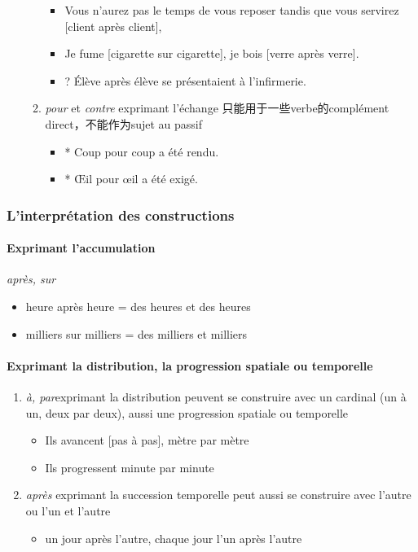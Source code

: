 \documentclass[UTF8]{report}
\begin{document}
\begin{enumerate}
\begin{enumerate}
        \begin{itemize}
            \item Vous n’aurez pas le temps de vous reposer tandis que vous servirez [client après client],
            \item Je fume [cigarette sur cigarette], je bois [verre après verre].
            \item ? Élève après élève se présentaient à l’infirmerie.
        \end{itemize}
        \item \textit{pour} et \textit{contre} exprimant l’échange 只能用于一些verbe的complément direct，不能作为sujet au passif
        \begin{itemize}
            \item * Coup pour coup a été rendu.
            \item * Œil pour œil a été exigé.
        \end{itemize}
    \end{enumerate}
\end{enumerate}

\subsubsection{L’interprétation des constructions}
\paragraph{Exprimant l’accumulation}
\textit{après, sur}
\begin{itemize}
    \item heure après heure = des heures et des heures
    \item milliers sur milliers = des milliers et milliers
\end{itemize}

\paragraph{Exprimant la distribution, la progression spatiale ou temporelle}
\begin{enumerate}
    \item \textit{à, par}exprimant la distribution peuvent se construire avec un cardinal (un à un, deux par deux), aussi une progression spatiale ou temporelle
    \begin{itemize}
        \item Ils avancent [pas à pas], mètre par mètre
        \item Ils progressent minute par minute
    \end{itemize}
    \item \textit{après} exprimant la succession temporelle peut aussi se construire avec l’autre ou l’un et l’autre
    \begin{itemize}
        \item un jour après l’autre, chaque jour l’un après l’autre
    \end{itemize}
\end{enumerate}
\end{document}
